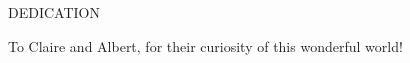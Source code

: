 \newpage
{}

\begin{center}
DEDICATION
\end{center}

\begin{center}
To Claire and Albert, for their curiosity of this wonderful world!
\end{center}
